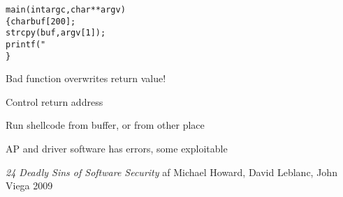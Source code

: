 \documentclass[Screen16to9,17pt]{foils}
\begin{document}


\begin{alltt}
main(int argc, char **argv)
\{      char buf[200];
        strcpy(buf, argv[1]);
        printf("%s\textbackslash{}n",buf);
\}
\end{alltt}





\begin{list1}
\item Bad function overwrites return value!
\item Control return address
\item Run shellcode from buffer, or from other place
\end{list1}




\centerline{AP and driver software has errors, some exploitable}








\emph{24 Deadly Sins of Software Security} af Michael Howard, David Leblanc, John Viega 2009
\end{document}
